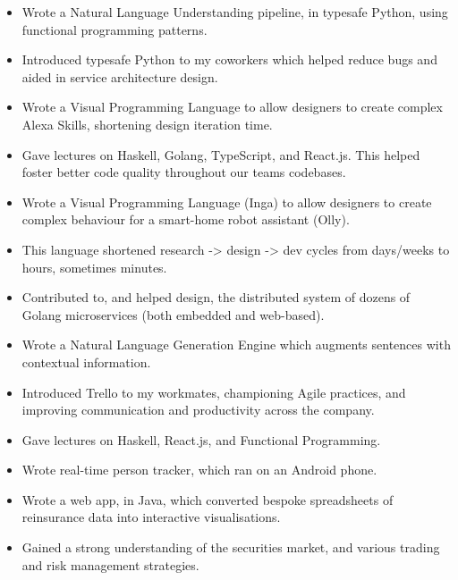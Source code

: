 \documentclass{jcgcv}
\begin{document}
\begin{column}
\begin{itemize}
  \item Wrote a Natural Language Understanding pipeline, in typesafe
        Python, using functional programming patterns.
  \item Introduced typesafe Python to my coworkers which helped reduce
        bugs and aided in service architecture design.
  \item Wrote a Visual Programming Language to allow designers to create
        complex Alexa Skills, shortening design iteration time.
  \item Gave lectures on Haskell, Golang, TypeScript, and React.js. This
        helped foster better code quality throughout our teams codebases.
\end{itemize}

\begin{itemize}
  \item Wrote a Visual Programming Language (Inga) to allow designers to
        create complex behaviour for a smart-home robot assistant (Olly).
  \item This language shortened research -> design -> dev cycles from 
        days/weeks to hours, sometimes minutes.
  \item Contributed to, and helped design, the distributed system of dozens
        of Golang microservices (both embedded and web-based).
  \item Wrote a Natural Language Generation Engine which augments sentences
        with contextual information.
  \item Introduced Trello to my workmates, championing Agile practices,
        and improving communication and productivity across the company.
  \item Gave lectures on Haskell, React.js, and Functional Programming.
\end{itemize}

\begin{itemize}
  \item Wrote real-time person tracker, which ran on an Android phone.
\end{itemize}

\begin{itemize}
  \item Wrote a web app, in Java, which converted bespoke spreadsheets of
        reinsurance data into interactive visualisations.
  \item Gained a strong understanding of the securities market, and various
        trading and risk management strategies.
\end{itemize}


\end{column}
\end{document}
